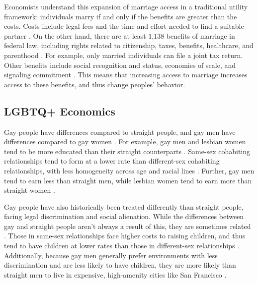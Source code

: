 \documentclass[12pt,letterpaper]{article}
\begin{document}
Economists understand this expansion of marriage access in a traditional utility framework: individuals marry if and only if the benefits are greater than the costs. Costs include legal fees and the time and effort needed to find a suitable partner \citep{9}. On the other hand, there are at least 1,138 benefits of marriage in federal law, including rights related to citizenship, taxes, benefits, healthcare, and parenthood \citep{1, 8}. For example, only married individuals can file a joint tax return. Other benefits include social recognition and status, economies of scale, and signaling commitment \citep{8}. This means that increasing access to marriage increases access to these benefits, and thus change peoples' behavior. 

\subsection{LGBTQ+ Economics}

Gay people have differences compared to straight people, and gay men have differences compared to gay women \citep{2, 15}. For example, gay men and lesbian women tend to be more educated than their straight counterparts \citep{2, 7, 11}. Same-sex cohabiting relationships tend to form at a lower rate than different-sex cohabiting relationships, with less homogeneity across age and racial lines \citep{2, 7}. Further, gay men tend to earn less than straight men, while lesbian women tend to earn more than straight women \citep{6}.

Gay people have also historically been treated differently than straight people, facing legal discrimination and social alienation. While the differences between gay and straight people aren’t always a result of this, they are sometimes related \citep{2}. Those in same-sex relationships face higher costs to raising children, and thus tend to have children at lower rates than those in different-sex relationships \citep{8, 10, 11}. Additionally, because gay men generally prefer environments with less discrimination and are less likely to have children, they are more likely than straight men to live in expensive, high-amenity cities like San Francisco \citep{7, 10, 11, 13}.
\end{document}
